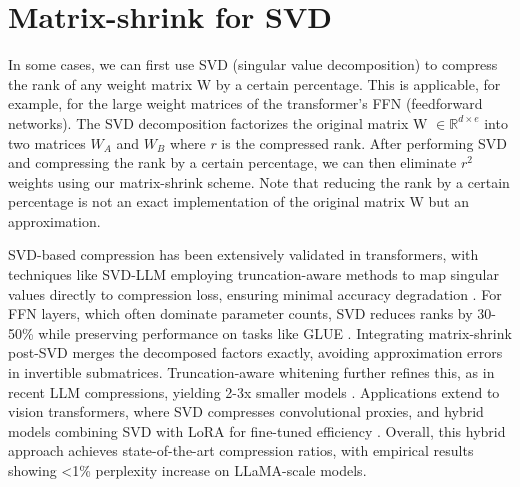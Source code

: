 \documentclass{article}
\begin{document}
\section{Matrix-shrink for SVD}
In some cases, we can first use SVD (singular value decomposition) to compress the rank of any weight matrix W by a certain percentage. This is applicable, for example, for the large weight matrices of the transformer’s FFN (feedforward networks). The SVD decomposition factorizes the original matrix W $\in \mathbb{R}^{d \times e}$ into two matrices $W_A$ and $W_B$ where $r$ is the compressed rank. After performing SVD and compressing the rank by a certain percentage, we can then eliminate $r^{2}$ weights using our matrix-shrink scheme. Note that reducing the rank by a certain percentage is not an exact implementation of the original matrix W but an approximation.

SVD-based compression has been extensively validated in transformers, with techniques like SVD-LLM employing truncation-aware methods to map singular values directly to compression loss, ensuring minimal accuracy degradation \cite{github2024svdllm}. For FFN layers, which often dominate parameter counts, SVD reduces ranks by 30-50\% while preserving performance on tasks like GLUE \cite{lesswrong2022svd}. Integrating matrix-shrink post-SVD merges the decomposed factors exactly, avoiding approximation errors in invertible submatrices. Truncation-aware whitening further refines this, as in recent LLM compressions, yielding 2-3x smaller models \cite{openreview2024svdllm}. Applications extend to vision transformers, where SVD compresses convolutional proxies, and hybrid models combining SVD with LoRA for fine-tuned efficiency \cite{cvpr2024pela}. Overall, this hybrid approach achieves state-of-the-art compression ratios, with empirical results showing <1\% perplexity increase on LLaMA-scale models.



\end{document}

